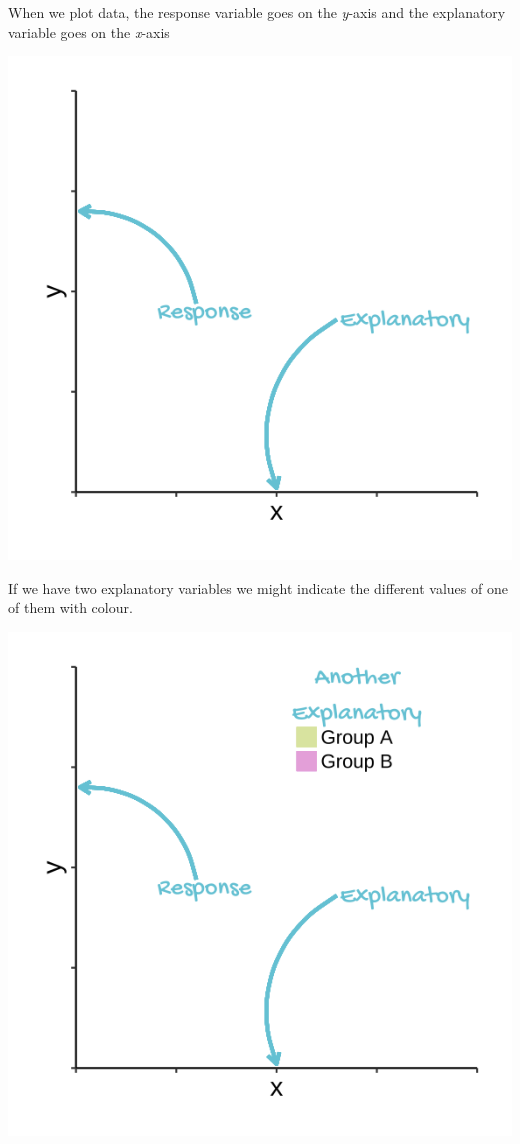 \documentclass[
]{book}
\begin{document}
When we plot data, the response variable goes on the \emph{y}-axis and the explanatory variable goes on the \emph{x}-axis

\begin{flushleft}\includegraphics[width=0.8\linewidth]{images/fig_1} \end{flushleft}

If we have two explanatory variables we might indicate the different values of one of them with colour.

\begin{flushleft}\includegraphics[width=0.8\linewidth]{images/fig_2} \end{flushleft}
\end{document}
